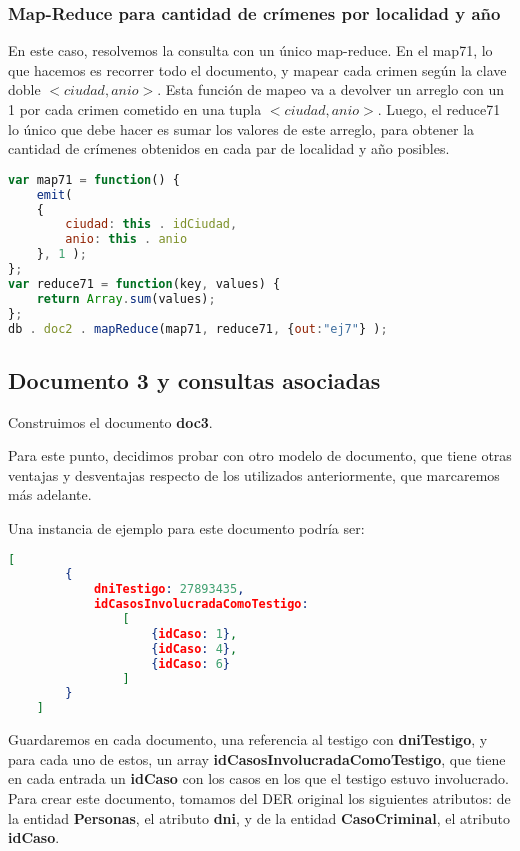 \documentclass[11pt, a4paper]{article}
\begin{document}
\subsubsection{Map-Reduce para cantidad de crímenes por localidad y año}

En este caso, resolvemos la consulta con un único map-reduce. En el map71, lo que hacemos es recorrer todo el documento, y mapear cada crimen según la clave doble $<ciudad, anio>$. Esta función de mapeo va a devolver un arreglo con un 1 por cada crimen cometido en una tupla $<ciudad, anio>$. Luego, el reduce71 lo único que debe hacer es sumar los valores de este arreglo, para obtener la cantidad de crímenes obtenidos en cada par de localidad y año posibles.

\begin{lstlisting}[language=JavaScript]
var map71 = function() {
    emit( 
    {
        ciudad: this . idCiudad, 
        anio: this . anio
    }, 1 );
};
var reduce71 = function(key, values) {
    return Array.sum(values);
};
db . doc2 . mapReduce(map71, reduce71, {out:"ej7"} );
\end{lstlisting}


\subsection{Documento 3 y consultas asociadas}

Construimos el documento \textbf{doc3}.

Para este punto, decidimos probar con otro modelo de documento, que tiene otras ventajas y desventajas respecto de los utilizados anteriormente, que marcaremos más adelante.

Una instancia de ejemplo para este documento podría ser:

\begin{lstlisting}[language=json]
	[
		{
			dniTestigo: 27893435,
			idCasosInvolucradaComoTestigo:
				[
					{idCaso: 1},
					{idCaso: 4},
					{idCaso: 6}
				]
		}
	]
\end{lstlisting}

Guardaremos en cada documento,  una referencia al testigo con \textbf{dniTestigo}, y para cada uno de estos, un array \textbf{idCasosInvolucradaComoTestigo}, que tiene en cada entrada un \textbf{idCaso} con los casos en los que el testigo estuvo involucrado. Para crear este documento, tomamos del DER original los siguientes atributos: de la entidad \textbf{Personas}, el atributo \textbf{dni}, y de la entidad \textbf{CasoCriminal}, el atributo \textbf{idCaso}. \
\end{document}
